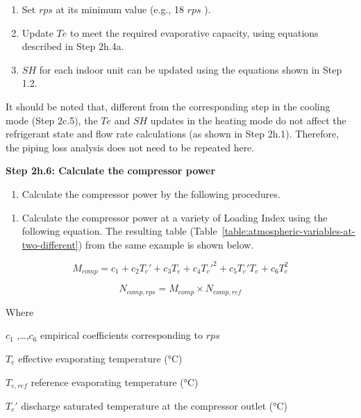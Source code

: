 \begin{enumerate}
\def\labelenumi{\alph{enumi}.}
\item
  Set \(rps\) at its minimum value (e.g., 18 \(rps\) ).
\item
  Update \(Te\) to meet the required evaporative capacity, using equations described in Step 2h.4a.
\item
  \(SH\) for each indoor unit can be updated using the equations shown in Step 1.2.
\end{enumerate}

It should be noted that, different from the corresponding step in the cooling mode (Step 2c.5), the \(Te\) and \(SH\) updates in the heating mode do not affect the refrigerant state and flow rate calculations (as shown in Step 2h.1). Therefore, the piping loss analysis does not need to be repeated here.

\textbf{Step 2h.6: Calculate the compressor power}

\begin{enumerate}
\def\labelenumi{(\arabic{enumi})}
\tightlist
\item
  Calculate the compressor power by the following procedures. 
\end{enumerate}

\begin{enumerate}
\def\labelenumi{\alph{enumi}.}
\tightlist
\item
  Calculate the compressor power at a variety of Loading Index using the following equation. The resulting table (Table~\ref{table:atmospheric-variables-at-two-different}) from the same example is shown below.
\end{enumerate}

\begin{equation}
  M_{comp} = c_1+c_2{T_c}'+c_3T_e+c_4{T_c}'^2+c_5{T_c}'T_e+c_6T_e^2
\end{equation}

\begin{equation}
  N_{comp,rps} = M_{comp} \times N_{comp,ref}
\end{equation}

Where

\(c_1\) ,\ldots{},\(c_6\) empirical coefficients corresponding to \(rps\)

\(T_e\) effective evaporating temperature (°C)

\(T_{e,ref}\) reference evaporating temperature (°C)

\({T_c}'\) discharge saturated temperature at the compressor outlet (°C)

